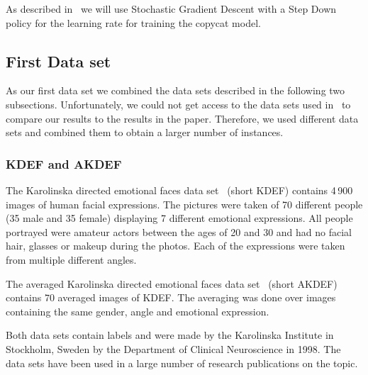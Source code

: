 \documentclass[a4paper,11pt]{article}
\begin{document}
    As described in~\cite{copycat} we will use Stochastic Gradient Descent with a Step Down policy for the learning rate for training the copycat model. 
    
    \subsection{First Data set}
        As our first data set we combined the data sets described in the following two subsections. 
        Unfortunately, we could not get access to the data sets used in~\cite{copycat} to compare our results to the results in the paper. Therefore, we used different data sets and combined them to obtain a larger number of instances.
        
        \subsubsection{KDEF and AKDEF}
            The Karolinska directed emotional faces data set~\cite{kdef} (short KDEF) contains 4\,900 images of human facial expressions. The pictures were taken of 70 different people (35 male and 35 female) displaying 7 different emotional expressions. All people portrayed were amateur actors between the ages of 20 and 30 and had no facial hair, glasses or makeup during the photos. Each of the expressions were taken from multiple different angles. 
            
            The averaged Karolinska directed emotional faces data set~\cite{kdef} (short AKDEF) contains $70$ averaged images of KDEF. The averaging was done over images containing the same gender, angle and emotional expression.
            
            Both data sets contain labels and were made by the Karolinska Institute in Stockholm, Sweden by the Department of Clinical Neuroscience in 1998. The data sets have been used in a large number of research publications on the topic. 
            
\end{document}
